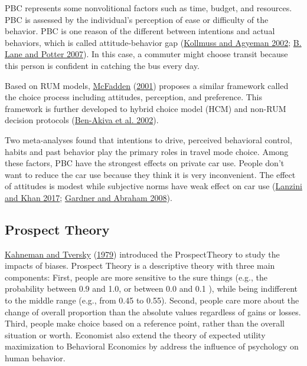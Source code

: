 \documentclass[
  11pt,
  openany]{memoir}
\begin{document}
PBC represents some nonvolitional factors such as time, budget, and resources. PBC is assessed by the individual's perception of ease or difficulty of the behavior. PBC is one reason of the different between intentions and actual behaviors, which is called attitude-behavior gap (\protect\hyperlink{ref-kollmussMindGapWhy2002}{Kollmuss and Agyeman 2002}; \protect\hyperlink{ref-laneAdoptionCleanerVehicles2007}{B. Lane and Potter 2007}). In this case, a commuter might choose transit because this person is confident in catching the bus every day.

Based on RUM models, \protect\hyperlink{ref-mcfaddenEconomicChoices2001}{McFadden} (\protect\hyperlink{ref-mcfaddenEconomicChoices2001}{2001}) proposes a similar framework called the choice process including attitudes, perception, and preference. This framework is further developed to hybrid choice model (HCM) and non-RUM decision protocols (\protect\hyperlink{ref-ben-akivaHybridChoiceModels2002}{Ben-Akiva et al. 2002}).

Two meta-analyses found that intentions to drive, perceived behavioral control, habits and past behavior play the primary roles in travel mode choice. Among these factors, PBC have the strongest effects on private car use. People don't want to reduce the car use because they think it is very inconvenient. The effect of attitudes is modest while subjective norms have weak effect on car use (\protect\hyperlink{ref-lanziniSheddingLightPsychological2017}{Lanzini and Khan 2017}; \protect\hyperlink{ref-gardnerPsychologicalCorrelatesCar2008}{Gardner and Abraham 2008}).

\hypertarget{prospect-theory}{%
\subsection{Prospect Theory}\label{prospect-theory}}

\protect\hyperlink{ref-kahnemanProspectTheoryAnalysis1979a}{Kahneman and Tversky} (\protect\hyperlink{ref-kahnemanProspectTheoryAnalysis1979a}{1979}) introduced the ProspectTheory to study the impacts of biases. Prospect Theory is a descriptive theory with three main components: First, people are more sensitive to the sure things (e.g., the probability between 0.9 and 1.0, or between 0.0 and 0.1 ), while being indifferent to the middle range (e.g., from 0.45 to 0.55). Second, people care more about the change of overall proportion than the absolute values regardless of gains or losses. Third, people make choice based on a reference point, rather than the overall situation or worth. Economist also extend the theory of expected utility maximization to Behavioral Economics by address the influence of psychology on human behavior.
\end{document}
